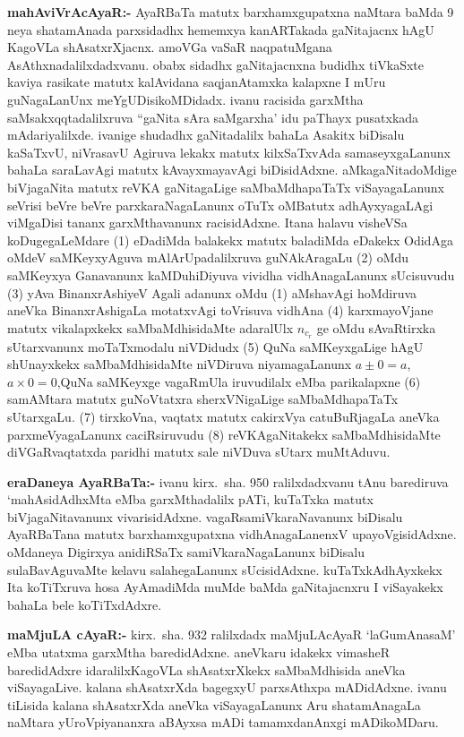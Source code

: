 \textbf{mahAviVrAcAyaR:-} AyaRBaTa matutx barxhamxgupatxna naMtara baMda {\rm 9} neya shatamAnada parxsidadhx hememxya kanARTakada gaNitajacnx hAgU KagoVLa shAsatxrXjacnx. amoVGa vaSaR naqpatuMgana AsAthxnadalilxdadxvanu. obabx sidadhx gaNitajacnxna budidhx tiVkaSxte kaviya rasikate matutx kalAvidana saqjanAtamxka kalapxne I mUru guNagaLanUnx meYgUDisi\break koMDidadx. ivanu racisida garxMtha saMsakxqqtadalilxruva ``gaNita sAra saMgarxha' idu paThayx pusatxkada mAdariyalilxde. ivanige shudadhx gaNitadalilx bahaLa Asakitx biDisalu kaSaTxvU, niVrasavU Agiruva lekakx matutx kilxSaTxvAda samaseyxgaLanunx bahaLa saraLavAgi matutx kAvayxmayavAgi biDisidAdxne. aMkagaNitadoMdige biVjagaNita matutx reVKA gaNitagaLige saMbaMdhapaTaTx viSayagaLanunx seVrisi beVre beVre parxkaraNagaLanunx oTuTx oMBatutx adhAyxya\-gaLAgi viMgaDisi tananx garxMthavanunx racisidAdxne. Itana halavu visheVSa koDugegaLeMdare {\rm (1)} eDadiMda balakekx matutx baladiMda eDakekx OdidAga oMdeV saMKeyxyAguva mAlA\-rUpadalilxruva guNAkAragaLu {\rm (2)} oMdu saMKeyxya Ganavanunx kaMDuhiDiyuva vividha vidhAnagaLanunx sUcisuvudu {\rm (3)} yAva BinanxrAshiyeV Agali adanunx oMdu {\rm (1)} aMshavAgi hoMdiruva aneVka BinanxrAshigaLa motatxvAgi toVrisuva vidhAna {\rm (4)} karxmayoVjane matutx vikalapxkekx saMbaMdhisidaMte adaralUlx $n_{c_{r}}$ ge oMdu sAvaRtirxka sUtarxvanunx moTaTxmodalu niVDidudx {\rm (5)} QuNa saMKeyxgaLige hAgU shUnayxkekx saMbaMdhisi\-daMte niVDiruva niyamagaLanunx 
$a \pm 0 = a$, $a \times 0 = 0$,\break QuNa saMKeyxge vagaRmUla iruvudilalx eMba parikalapxne {\rm (6)} samAMtara matutx guNoVtatxra sherxVNigaLige saMbaMdhapaTaTx sUtarxgaLu. {\rm (7)} tirxkoVna, vaqtatx matutx cakirxVya catuBuRjagaLa aneVka parxmeVyagaLanunx caciRsiruvudu {\rm (8)} reVKAgaNitakekx saMbaMdhisidaMte diVGaRvaqtatxda paridhi matutx sale niVDuva sUtarx muMtAduvu.

\textbf{eraDaneya AyaRBaTa:-} ivanu kirx.~sha. {\rm 950} ralilxdadxvanu tAnu barediruva `mahAsidAdhxMta eMba garxMthadalilx pATi, kuTaTxka matutx biVjagaNitavanunx vivarisidAdxne. vagaRsamiVkaraNavanunx biDisalu AyaRBaTana matutx barxhamxgupatxna vidhAnagaLanenxV upayoVgisidAdxne. oMdaneya Digirxya anidiRSaTx samiVkaraNagaLanunx biDisalu sulaBavAguvaMte kelavu salahegaLanunx sUcisidAdxne. kuTaTxkAdhAyxkekx Ita koTiTxruva hosa AyAmadiMda muMde baMda gaNitajacnxru I viSayakekx bahaLa bele koTiTxdAdxre.

\textbf{maMjuLA cAyaR:-} kirx.~sha. {\rm 932} ralilxdadx maMjuLAcAyaR `laGumAnasaM' eMba utatxma garxMtha baredidAdxne. aneVkaru idakekx vimasheR baredidAdxre idaralilx\break KagoVLa shAsatxrXkekx saMbaMdhisida aneVka viSayagaLive. kalana shAsatxrXda bagegxyU parxsAthxpa mADidAdxne. ivanu tiLisida kalana shAsatxrXda aneVka viSayagaLanunx Aru shatamAnagaLa naMtara yUroVpiyananxra aBAyxsa mADi tamamxdanAnxgi mADikoMDaru. 


